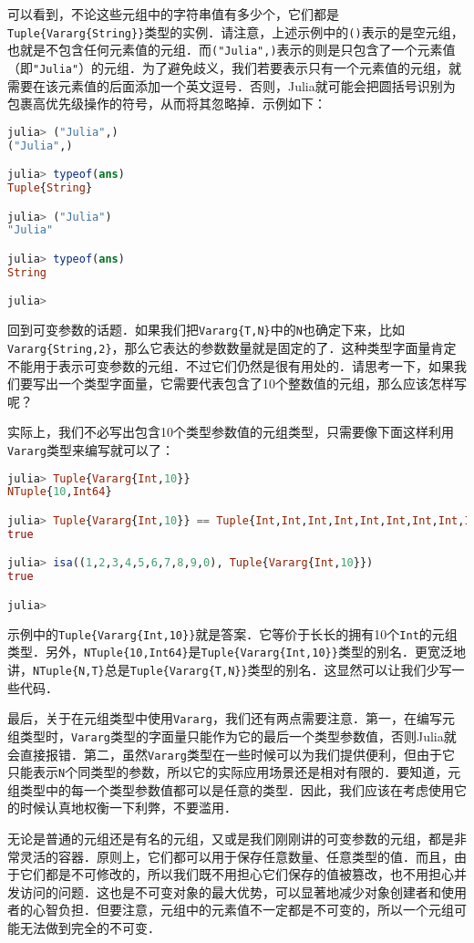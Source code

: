 可以看到，不论这些元组中的字符串值有多少个，它们都是\verb|Tuple{Vararg{String}}|类型的实例．请注意，上述示例中的\verb|()|表示的是空元组，也就是不包含任何元素值的元组．而\verb|("Julia",)|表示的则是只包含了一个元素值（即\verb|"Julia"|）的元组．为了避免歧义，我们若要表示只有一个元素值的元组，就需要在该元素值的后面添加一个英文逗号．否则，Julia就可能会把圆括号识别为包裹高优先级操作的符号，从而将其忽略掉．示例如下：
\begin{lstlisting}[language=julia]
julia> ("Julia",)
("Julia",)

julia> typeof(ans)
Tuple{String}

julia> ("Julia")
"Julia"

julia> typeof(ans)
String

julia> 
\end{lstlisting}

回到可变参数的话题．如果我们把\verb|Vararg{T,N}|中的\verb|N|也确定下来，比如\verb|Vararg{String,2}|，那么它表达的参数数量就是固定的了．这种类型字面量肯定不能用于表示可变参数的元组．不过它们仍然是很有用处的．请思考一下，如果我们要写出一个类型字面量，它需要代表包含了10个整数值的元组，那么应该怎样写呢？

实际上，我们不必写出包含10个类型参数值的元组类型，只需要像下面这样利用\verb|Vararg|类型来编写就可以了：
\begin{lstlisting}[language=julia]
julia> Tuple{Vararg{Int,10}}
NTuple{10,Int64}

julia> Tuple{Vararg{Int,10}} == Tuple{Int,Int,Int,Int,Int,Int,Int,Int,Int,Int}
true

julia> isa((1,2,3,4,5,6,7,8,9,0), Tuple{Vararg{Int,10}})
true

julia> 
\end{lstlisting}

示例中的\verb|Tuple{Vararg{Int,10}}|就是答案．它等价于长长的拥有10个\verb|Int|的元组类型．另外，\verb|NTuple{10,Int64}|是\verb|Tuple{Vararg{Int,10}}|类型的别名．更宽泛地讲，\verb|NTuple{N,T}|总是\verb|Tuple{Vararg{T,N}}|类型的别名．这显然可以让我们少写一些代码．

最后，关于在元组类型中使用\verb|Vararg|，我们还有两点需要注意．第一，在编写元组类型时，\verb|Vararg|类型的字面量只能作为它的最后一个类型参数值，否则Julia就会直接报错．第二，虽然\verb|Vararg|类型在一些时候可以为我们提供便利，但由于它只能表示\verb|N|个同类型的参数，所以它的实际应用场景还是相对有限的．要知道，元组类型中的每一个类型参数值都可以是任意的类型．因此，我们应该在考虑使用它的时候认真地权衡一下利弊，不要滥用．

无论是普通的元组还是有名的元组，又或是我们刚刚讲的可变参数的元组，都是非常灵活的容器．原则上，它们都可以用于保存任意数量、任意类型的值．而且，由于它们都是不可修改的，所以我们既不用担心它们保存的值被篡改，也不用担心并发访问的问题．这也是不可变对象的最大优势，可以显著地减少对象创建者和使用者的心智负担．但要注意，元组中的元素值不一定都是不可变的，所以一个元组可能无法做到完全的不可变．